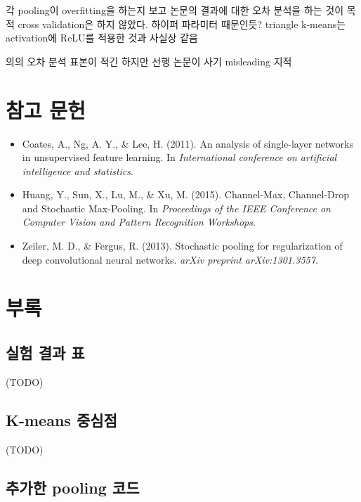 \documentclass[a4paper,9pt]{article}
\begin{document}
\begin{multicols*}{2}
각 pooling이 overfitting을 하는지 보고 논문의 결과에 대한 오차 분석을 하는 것이 목적
cross validation은 하지 않았다.
하이퍼 파라미터 때문인듯?
triangle k-means는 activation에 ReLU를 적용한 것과 사실상 같음

의의
오차 분석
표본이 적긴 하지만 선행 논문이 사기
misleading 지적

\section*{참고 문헌}

\begin{itemize}
\item Coates, A., Ng, A. Y., \& Lee, H. (2011). An analysis of single-layer networks in unsupervised feature learning. In \textit{International conference on artificial intelligence and statistics}.
\item Huang, Y., Sun, X., Lu, M., \& Xu, M. (2015). Channel-Max, Channel-Drop and Stochastic Max-Pooling. In \textit{Proceedings of the IEEE Conference on Computer Vision and Pattern Recognition Workshops}.
\item Zeiler, M. D., \& Fergus, R. (2013). Stochastic pooling for regularization of deep convolutional neural networks. \textit{arXiv preprint arXiv:1301.3557}.
\end{itemize}

\end{multicols*}

\pagebreak

\section*{부록}

\subsection*{실험 결과 표}

(TODO)

\subsection*{K-means 중심점}

(TODO)

\subsection*{추가한 pooling 코드}
\end{document}
